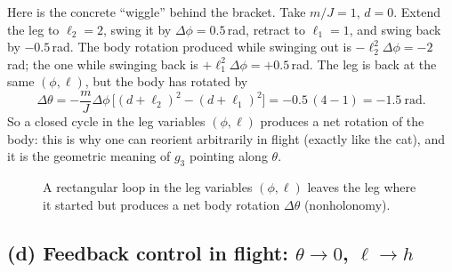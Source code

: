 \documentclass[11pt,a4paper]{article}
\def\boldsymbol#1{#1}%
\newcommand{\g}{\boldsymbol{g}}
\theoremstyle{definition}
\theoremstyle{plain}
\theoremstyle{remark}
\begin{document}
\begin{intuition}
Here is the concrete ``wiggle'' behind the bracket. Take $m/J=1$, $d=0$. Extend the leg to $\ell_2=2$, swing it by $\Delta\phi=0.5$\,rad, retract to $\ell_1=1$, and swing back by $-0.5$\,rad. The body rotation produced while swinging out is $-\ell_2^2\Delta\phi=-2$\,rad; the one while swinging back is $+\ell_1^2\Delta\phi=+0.5$\,rad. The leg is back at the same $(\phi,\ell)$, but the body has rotated by
\[
  \Delta\theta=-\frac{m}{J}\Delta\phi\,\big[(d+\ell_2)^2-(d+\ell_1)^2\big]=-0.5\,(4-1)=-1.5\ \text{rad}.
\]
So a closed cycle in the leg variables $(\phi,\ell)$ produces a net rotation of the body: this is why one can reorient arbitrarily in flight (exactly like the cat), and it is the geometric meaning of $\g_3$ pointing along $\theta$.
\end{intuition}

\begin{figure}[H]
\centering
{}
\caption{A rectangular loop in the leg variables $(\phi,\ell)$ leaves the leg where it started but produces a net body rotation $\Delta\theta$ (nonholonomy).}
\end{figure}

\subsection{(d) Feedback control in flight: $\theta\to0$, $\ell\to h$}
\end{document}
